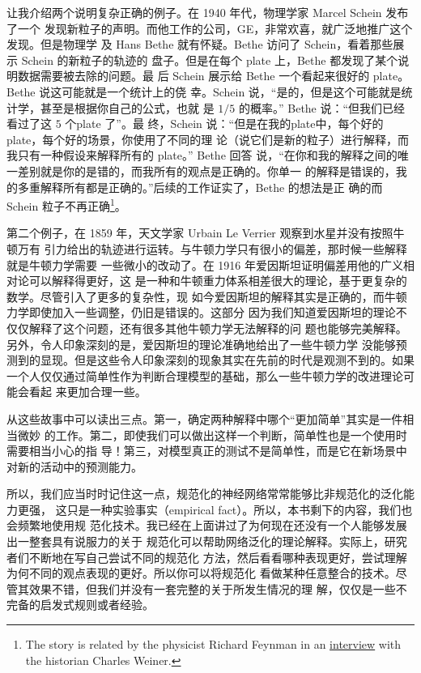 让我介绍两个说明复杂正确的例子。在 1940 年代，物理学家 Marcel Schein 发布了一个
发现新粒子的声明。而他工作的公司，GE，非常欢喜，就广泛地推广这个发现。但是物理学
及 Hans Bethe 就有怀疑。Bethe 访问了 Schein，看着那些展示 Schein 的新粒子的轨迹的
盘子。但是在每个 plate 上，Bethe 都发现了某个说明数据需要被去除的问题。最
后 Schein 展示给 Bethe 一个看起来很好的 plate。Bethe 说这可能就是一个统计上的侥
幸。Schein 说，“是的，但是这个可能就是统计学，甚至是根据你自己的公式，也就
是 $1/5$ 的概率。” Bethe 说：“但我们已经看过了这 $5$ 个plate 了”。最
终，Schein 说：“但是在我的plate中，每个好的plate，每个好的场景，你使用了不同的理
论（说它们是新的粒子）进行解释，而我只有一种假设来解释所有的 plate。” Bethe 回答
说，“在你和我的解释之间的唯一差别就是你的是错的，而我所有的观点是正确的。你单一
的解释是错误的，我的多重解释所有都是正确的。”后续的工作证实了，Bethe 的想法是正
确的而 Schein 粒子不再正确\footnote{The story is related by the physicist
  Richard Feynman in an
  \href{https://www.aip.org/history-programs/niels-bohr-library/oral-histories/5020-4}{interview}
  with the historian Charles Weiner.}。

第二个例子，在 1859 年，天文学家 Urbain Le Verrier 观察到水星并没有按照牛顿万有
引力给出的轨迹进行运转。与牛顿力学只有很小的偏差，那时候一些解释就是牛顿力学需要
一些微小的改动了。在 1916 年爱因斯坦证明偏差用他的广义相对论可以解释得更好，这
是一种和牛顿重力体系相差很大的理论，基于更复杂的数学。尽管引入了更多的复杂性，现
如今爱因斯坦的解释其实是正确的，而牛顿力学即使加入一些调整，仍旧是错误的。这部分
因为我们知道爱因斯坦的理论不仅仅解释了这个问题，还有很多其他牛顿力学无法解释的问
题也能够完美解释。另外，令人印象深刻的是，爱因斯坦的理论准确地给出了一些牛顿力学
没能够预测到的显现。但是这些令人印象深刻的现象其实在先前的时代是观测不到的。如果
一个人仅仅通过简单性作为判断合理模型的基础，那么一些牛顿力学的改进理论可能会看起
来更加合理一些。

从这些故事中可以读出三点。第一，确定两种解释中哪个“更加简单”其实是一件相当微妙
的工作。第二，即使我们可以做出这样一个判断，简单性也是一个使用时需要相当小心的指
导！第三，对模型真正的测试不是简单性，而是它在新场景中对新的活动中的预测能力。

所以，我们应当时时记住这一点，规范化的神经网络常常能够比非规范化的泛化能力更强，
这只是一种实验事实（empirical fact）。所以，本书剩下的内容，我们也会频繁地使用规
范化技术。我已经在上面讲过了为何现在还没有一个人能够发展出一整套具有说服力的关于
规范化可以帮助网络泛化的理论解释。实际上，研究者们不断地在写自己尝试不同的规范化
方法，然后看看哪种表现更好，尝试理解为何不同的观点表现的更好。所以你可以将规范化
看做某种任意整合的技术。尽管其效果不错，但我们并没有一套完整的关于所发生情况的理
解，仅仅是一些不完备的启发式规则或者经验。

